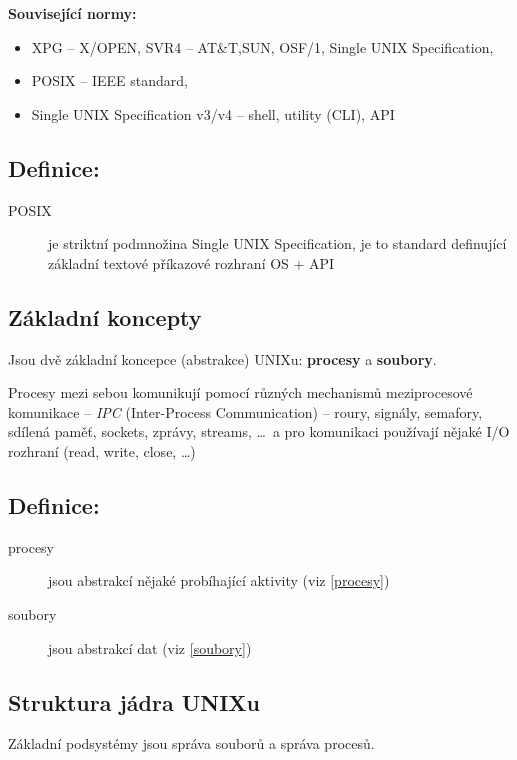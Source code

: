 \documentclass[a4paper, 11pt]{article}
\begin{document}
\textbf{Související normy:}
\begin{itemize}
    \item XPG -- X/OPEN, SVR4 -- AT\&T,SUN, OSF/1, Single UNIX Specification,
    \item POSIX -- IEEE standard,
    \item Single UNIX Specification v3/v4 -- shell, utility (CLI), API
\end{itemize}
 
\subsection*{Definice:}
\begin{description}
\item[POSIX] je striktní podmnožina Single UNIX Specification, je to standard definující základní textové příkazové rozhraní OS + API
\end{description}
 
\newpage
\subsection{Základní koncepty}
Jsou dvě základní koncepce (abstrakce) UNIXu: \textbf{procesy} a \textbf{soubory}.

 Procesy mezi sebou komunikují pomocí různých mechanismů meziprocesové komunikace -- \emph{IPC} (Inter-Process Communication) -- roury, signály, semafory, sdílená paměť, sockets, zprávy, streams, \ldots\ a pro komunikaci používají nějaké I/O rozhraní (read, write, close, \ldots)
 
\subsection*{Definice:}
\begin{description}
\item[procesy] jsou abstrakcí nějaké probíhající aktivity (viz \ref{procesy})
\item[soubory] jsou abstrakcí dat (viz \ref{soubory})
\end{description}

\subsection{Struktura jádra UNIXu}
Základní podsystémy jsou správa souborů a správa procesů.
 
\end{document}
